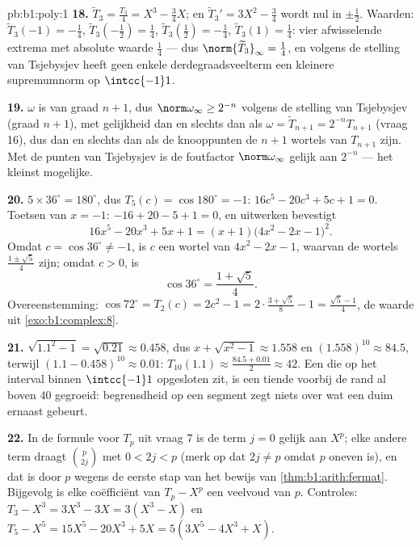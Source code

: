 \begin{solution}{pb:b1:poly:1}
\textbf{18.} $\widetilde T_3 = \frac{T_3}4 = X^3 - \frac34X$; en
$\widetilde T_3{}' = 3X^2 - \frac34$ wordt nul in $\pm\frac12$. Waarden:
$\widetilde T_3(-1) = -\frac14$, $\widetilde T_3(-\tfrac12) = \frac14$,
$\widetilde T_3(\tfrac12) = -\frac14$, $\widetilde T_3(1) = \frac14$:
vier afwisselende extrema met absolute waarde $\frac14$ --- dus
$\norm{\widetilde T_3}_\infty = \frac14$, en volgens de stelling van
Tsjebysjev heeft geen enkele  derdegraadsveelterm een kleinere
supremumnorm op $\intcc{-1}1$.

\textbf{19.} $\omega$ is  van graad $n + 1$, dus
$\norm\omega_\infty \geq 2^{-n}$ volgens de stelling van Tsjebysjev
(graad $n+1$), met gelijkheid dan en slechts dan als $\omega = \widetilde
T_{n+1} = 2^{-n}T_{n+1}$ (vraag 16), dus dan en slechts dan als de
knooppunten de $n + 1$ wortels van $T_{n+1}$ zijn. Met de punten van
Tsjebysjev is de foutfactor $\norm\omega_\infty$ gelijk aan $2^{-n}$ ---
het kleinst mogelijke.

\textbf{20.} $5 \times 36^\circ = 180^\circ$, dus $T_5(c) = \cos180^\circ
= -1$: $16c^5 - 20c^3 + 5c + 1 = 0$. Toetsen van $x = -1$: $-16 + 20 - 5
+ 1 = 0$, en uitwerken bevestigt
\[
16x^5 - 20x^3 + 5x + 1 = (x + 1)\bigl(4x^2 - 2x - 1\bigr)^2 .
\]
Omdat $c = \cos36^\circ \neq -1$, is $c$ een wortel van $4x^2 - 2x - 1$,
waarvan de wortels $\frac{1 \pm \sqrt5}4$ zijn; omdat $c > 0$, is
\[
\cos36^\circ = \frac{1 + \sqrt5}4 .
\]
Overeenstemming: $\cos72^\circ = T_2(c) = 2c^2 - 1 = 2\cdot\frac{3 +
\sqrt5}8 - 1 = \frac{\sqrt5 - 1}4$, de waarde uit
\cref{exo:b1:complex:8}.

\textbf{21.} $\sqrt{1.1^2 - 1} = \sqrt{0.21} \approx 0.458$, dus $x +
\sqrt{x^2-1} \approx 1.558$ en $(1.558)^{10} \approx 84.5$, terwijl
$(1.1 - 0.458)^{10} \approx 0.01$: $T_{10}(1.1) \approx \frac{84.5 +
0.01}2 \approx 42$. Een  die op het interval binnen $\intcc{-1}1$
opgesloten zit, is een tiende voorbij de rand al boven $40$ gegroeid:
begrensdheid op een segment zegt niets over wat een duim ernaast gebeurt.

\textbf{22.} In de formule voor $T_p$ uit vraag 7 is de term $j = 0$
gelijk aan $X^p$; elke andere term draagt $\binom p{2j}$ met $0 < 2j < p$
(merk op dat $2j \neq p$ omdat $p$ oneven is), en dat is  door
$p$ wegens de eerste stap van het bewijs van
\cref{thm:b1:arith:fermat}. Bijgevolg is elke coëfficiënt van $T_p - X^p$
een veelvoud van $p$. Controles: $T_3 - X^3 = 3X^3 - 3X = 3(X^3 - X)$ en
$T_5 - X^5 = 15X^5 - 20X^3 + 5X = 5(3X^5 - 4X^3 + X)$.


\end{solution}
